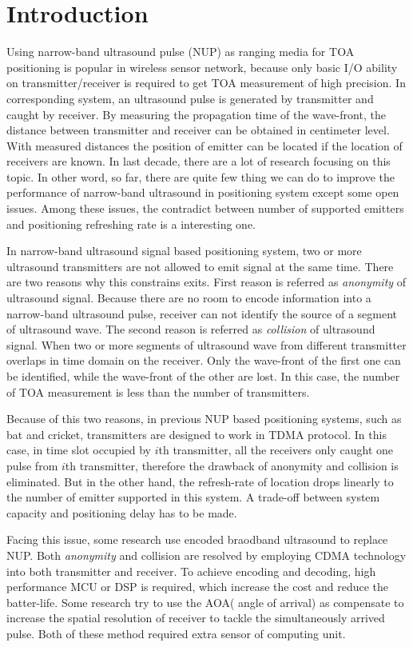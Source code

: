 \documentclass[conference]{IEEEtran}
\begin{document}
\section{Introduction}
Using narrow-band ultrasound pulse (NUP) as ranging media for TOA positioning is
popular in wireless sensor network, because only basic I/O ability on
transmitter/receiver is required to get TOA measurement of high precision. In
corresponding system, an ultrasound pulse is generated by transmitter and caught by
receiver. By measuring the propagation time of the wave-front, the distance between
transmitter and receiver can be obtained in centimeter level\cite{Priyantha:2000hx}.
With measured distances the position of emitter can be located if the location of
receivers are known.  In last decade, there are a lot of research focusing on this
topic. In other word, so far, there are quite few thing we can do to improve the
performance of narrow-band ultrasound in positioning system except some open issues.
Among these issues, the contradict between number of supported emitters and positioning
refreshing rate is a interesting one.  

In narrow-band ultrasound signal based positioning system, two or more ultrasound
transmitters are not allowed to emit signal at the same time. There are two reasons why
this constrains exits. First reason is referred as \emph{anonymity} of ultrasound
signal. Because there are no room to encode information into a narrow-band ultrasound
pulse, receiver can not identify the source of a segment of ultrasound wave. The second
reason is referred as \emph{collision} of ultrasound signal. When two or more segments
of ultrasound wave from different transmitter overlaps in time domain on the receiver.
Only the wave-front of the first one can be identified, while the wave-front of the
other are lost. In this case, the number of TOA measurement is less than the number of
transmitters.  

Because of this two reasons, in previous NUP based positioning systems, such as bat and
cricket,   transmitters are designed to work in TDMA protocol. In this case, in time
slot occupied by $i$th transmitter, all the receivers only caught one pulse from $i$th
transmitter, therefore the drawback of anonymity and collision is eliminated. But in
the other hand, the refresh-rate of location  drops linearly to the number of emitter
supported in this system. A trade-off between system capacity and positioning delay has
to be made.

Facing this issue, some research use encoded braodband ultrasound to replace NUP. Both
\emph{anonymity} and {collision} are resolved by employing CDMA technology into both
transmitter and receiver\cite{Hazas:2006tv}. To achieve encoding and decoding, high
performance MCU or DSP is required, which increase the cost and reduce the batter-life.
Some research try to use the AOA( angle of arrival) as compensate to increase the
spatial resolution of receiver to tackle the simultaneously arrived
pulse\cite{Yu:2009ix}. Both of these method required extra sensor of computing unit. 
\end{document}

